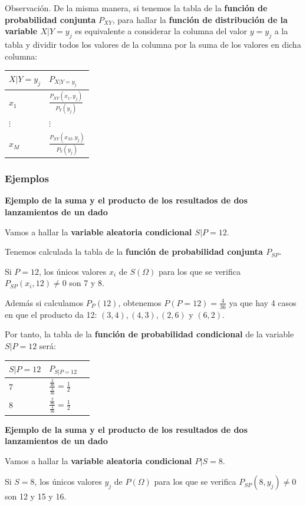 \documentclass[]{book}
\begin{document}
Observación.
De la misma manera, si tenemos la tabla de la \textbf{función de probabilidad conjunta} \(P_{XY}\), para hallar la \textbf{función de distribución de la variable \(X|Y=y_j\)} es equivalente a considerar la columna del valor \(y=y_j\) a la tabla y dividir todos los valores de la columna por la suma de los valores en dicha columna:

\begin{longtable}[]{@{}ll@{}}
\toprule
\(X|Y=y_j\) & \(P_{X|Y=y_j}\)\tabularnewline
\midrule
\endhead
\(x_1\) & \(\frac{P_{XY}(x_1,y_j)}{P_Y(y_j)}\)\tabularnewline
\(\vdots\) & \(\vdots\)\tabularnewline
\(x_M\) & \(\frac{P_{XY}(x_M,y_j)}{P_Y(y_j)}\)\tabularnewline
\bottomrule
\end{longtable}

\hypertarget{ejemplos-9}{%
\subsubsection{Ejemplos}\label{ejemplos-9}}

\textbf{Ejemplo de la suma y el producto de los resultados de dos lanzamientos de un dado}

Vamos a hallar la \textbf{variable aleatoria condicional \(S|P=12\)}.

Tenemos calculada la tabla de la \textbf{función de probabilidad conjunta \(P_{SP}\)}.

Si \(P=12\), los únicos valores \(x_i\) de \(S(\Omega)\) para los que se verifica \(P_{SP}(x_i,12)\neq 0\) son 7 y 8.

Además si calculamos \(P_P(12)\), obtenemos \(P(P=12)=\frac{4}{36}\) ya que hay 4 casos en que el producto da 12: \((3,4), (4,3), (2,6)\) y \((6,2)\).

Por tanto, la tabla de la \textbf{función de probabilidad condicional} de la variable \(S|P=12\) será:

\begin{longtable}[]{@{}lll@{}}
\toprule
\(S|P=12\) & \(P_{S|P=12}\) &\tabularnewline
\midrule
\endhead
\(7\) & \(\frac{\frac{2}{36}}{\frac{4}{36}}=\frac{1}{2}\) &\tabularnewline
\(8\) & \(\frac{\frac{2}{36}}{\frac{4}{36}}=\frac{1}{2}\) &\tabularnewline
\bottomrule
\end{longtable}

\textbf{Ejemplo de la suma y el producto de los resultados de dos lanzamientos de un dado}

Vamos a hallar la \textbf{variable aleatoria condicional \(P|S=8\)}.

Si \(S=8\), los únicos valores \(y_j\) de \(P(\Omega)\) para los que se verifica \(P_{SP}(8,y_j)\neq 0\) son 12 y 15 y 16.
\end{document}
